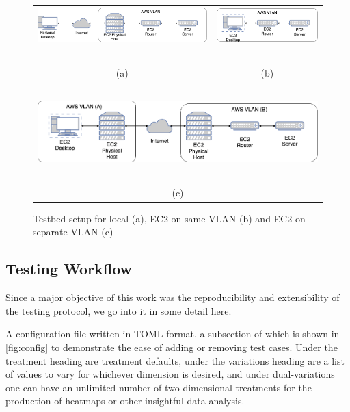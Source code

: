 \documentclass[12pt]{article}
\begin{document}
\begin{figure}
\begin{tabular}{c c}
\includegraphics[scale=.25]{images/local.png} & \includegraphics[scale=.25]{images/aws.png}\\
~ & ~ \\
(a) & (b) \\
~ & ~ \\
\multicolumn{2}{c}{\includegraphics[scale=.25]{images/aws_inet.png}} \\
~ & ~ \\
\multicolumn{2}{c}{(c)} \\
\end{tabular}
\caption{Testbed setup for local (a), EC2 on same VLAN (b) and EC2 on separate VLAN (c)}
\label{fig:network}
\end{figure}

\subsection{Testing Workflow}
Since a major objective of this work was the reproducibility and extensibility of the testing protocol, we go into it in some detail here.

A configuration file written in TOML format, a subsection of which is shown in \ref{fig:config} to demonstrate the ease of adding or removing test cases. Under the treatment heading are treatment defaults, under the variations heading are a list of values to vary for whichever dimension is desired, and under dual-variations one can have an unlimited number of two dimensional treatments for the production of heatmaps or other insightful data analysis.
\end{document}
